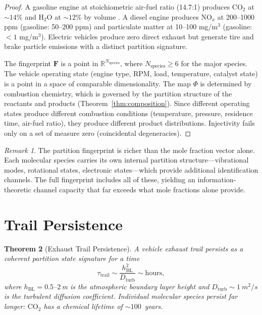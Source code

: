 \documentclass[11pt,twocolumn,a4paper]{article}
\theoremstyle{plain}
\newtheorem{theorem}{Theorem}[section]
\theoremstyle{definition}
\theoremstyle{remark}
\newtheorem{remark}[theorem]{Remark}
\newcommand{\Dturb}{D_{\mathrm{turb}}}
\newcommand{\hBL}{h_{\mathrm{BL}}}
\begin{document}
\begin{proof}
A gasoline engine at stoichiometric air-fuel ratio (14.7:1) produces $\mathrm{CO}_2$ at $\sim 14\%$ and $\mathrm{H}_2\mathrm{O}$ at $\sim 12\%$ by volume \cite{heywood2018internal}. A diesel engine produces $\mathrm{NO}_x$ at 200--1000 ppm (gasoline: 50--200 ppm) and particulate matter at 10--100 mg/m$^3$ (gasoline: $< 1$ mg/m$^3$). Electric vehicles produce zero direct exhaust but generate tire and brake particle emissions with a distinct partition signature.

The fingerprint $\mathbf{F}$ is a point in $\mathbb{R}^{N_{\mathrm{species}}}$, where $N_{\mathrm{species}} \geq 6$ for the major species. The vehicle operating state (engine type, RPM, load, temperature, catalyst state) is a point in a space of comparable dimensionality. The map $\Phi$ is determined by combustion chemistry, which is governed by the partition structure of the reactants and products (Theorem~\ref{thm:composition}). Since different operating states produce different combustion conditions (temperature, pressure, residence time, air-fuel ratio), they produce different product distributions. Injectivity fails only on a set of measure zero (coincidental degeneracies).
\end{proof}

\begin{remark}
The partition fingerprint is richer than the mole fraction vector alone. Each molecular species carries its own internal partition structure---vibrational modes, rotational states, electronic states---which provide additional identification channels. The full fingerprint includes all of these, yielding an information-theoretic channel capacity that far exceeds what mole fractions alone provide.
\end{remark}


\section{Trail Persistence}
\label{sec:trail_persistence}

\begin{theorem}[Exhaust Trail Persistence]
\label{thm:trail_persistence}
A vehicle exhaust trail persists as a coherent partition state signature for a time
\begin{equation}
\tau_{\mathrm{trail}} \sim \frac{\hBL^2}{\Dturb} \sim \text{hours},
\label{eq:trail_persistence}
\end{equation}
where $\hBL = 0.5$--$2$\,m is the atmospheric boundary layer height and $\Dturb \sim \SI{1}{m^2/s}$ is the turbulent diffusion coefficient. Individual molecular species persist far longer: $\mathrm{CO}_2$ has a chemical lifetime of $\sim 100$~years.
\end{theorem}
\end{document}
